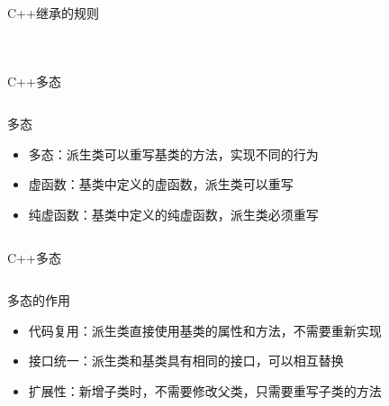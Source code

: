 \documentclass[UTF8,aspectratio=169]{beamer}
\begin{document}
\begin{frame}[fragile]{C++继承的规则}
    \begin{columns}
        \begin{column}{0.48\textwidth}
            \inputminted[firstline=17,lastline=37]{cpp}{code/cpp_inherit_rule.cpp}
        \end{column}
        \begin{column}{0.48\textwidth}
            \inputminted[firstline=38,lastline=57]{cpp}{code/cpp_inherit_rule.cpp}
        \end{column}
    \end{columns}
\end{frame}

\begin{frame}[fragile]{C++多态}
    \begin{columns}
        \begin{column}{0.48\textwidth}
            \begin{ytublock}{多态}
                \begin{itemize}
                    \item 多态：派生类可以重写基类的方法，实现不同的行为
                    \item 虚函数：基类中定义的虚函数，派生类可以重写
                    \item 纯虚函数：基类中定义的纯虚函数，派生类必须重写
                \end{itemize}
            \end{ytublock}
        \end{column}
        \begin{column}{0.48\textwidth}
            \inputminted[firstline=1,lastline=17]{cpp}{code/cpp_polymorphism_example.cpp}
        \end{column}
    \end{columns}
\end{frame}

\begin{frame}[fragile]{C++多态}
    \begin{columns}
        \begin{column}{0.48\textwidth}
            \begin{ytublock}{多态的作用}
                \begin{itemize}
                    \item 代码复用：派生类直接使用基类的属性和方法，不需要重新实现
                    \item 接口统一：派生类和基类具有相同的接口，可以相互替换
                    \item 扩展性：新增子类时，不需要修改父类，只需要重写子类的方法
                \end{itemize}
            \end{ytublock}
        \end{column}
        \begin{column}{0.48\textwidth}
            \inputminted[firstline=19,lastline=33]{cpp}{code/cpp_polymorphism_example.cpp}
        \end{column}
    \end{columns}
\end{frame}
\end{document}
